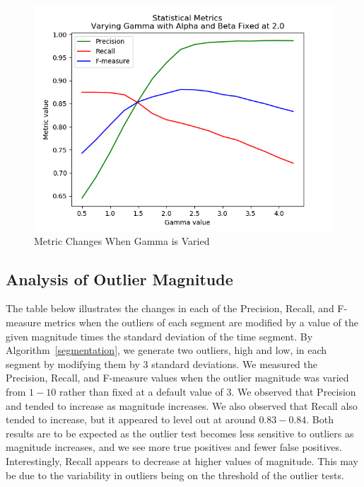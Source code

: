 \documentclass[conference]{IEEEtran}
\begin{document}
\begin{figure}
	\centering
	\includegraphics[width = 0.95 \linewidth]{GammaResults.png}
	\caption{Metric Changes When Gamma is Varied}
	\label{gammaResults}
\end{figure}

\subsection{Analysis of Outlier Magnitude}
The table below illustrates the changes in each of the Precision, Recall, and F-measure metrics when the outliers of each segment are modified by a value of the given magnitude times the standard deviation of the time segment. By Algorithm~\ref{segmentation}, we generate two outliers, high and low, in each segment by modifying them by $3$ standard deviations. We measured the Precision, Recall, and F-measure values when the outlier magnitude was varied from $1-10$ rather than fixed at a default value of $3$. We observed that Precision and tended to increase as magnitude increases. We also observed that Recall also tended to increase, but it appeared to level out at around $0.83-0.84$. Both results are to be expected as the outlier test becomes less sensitive to outliers as magnitude increases, and we see more true positives and fewer false positives. Interestingly, Recall appears to decrease at higher values of magnitude. This may be due to the variability in outliers being on the threshold of the outlier tests.
\end{document}
